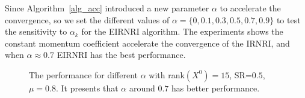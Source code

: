 \documentclass[twoside,11pt]{article}
\numberwithin{equation}{section}
\begin{document}
Since Algorithm~\ref{alg_acc} introduced a new parameter $\alpha$ to accelerate the convergence, 
so we set the different values of $\alpha =\{ 0,0.1,0.3,0.5,0.7,0.9\}$ to test the sensitivity to $\alpha_{k}$ for the EIRNRI algorithm. 
The experiments shows the constant momentum coefficient accelerate the convergence of the IRNRI,  and when $\alpha\approx 0.7$ EIRNRI has the best performance.
\begin{figure}[H]
  \captionsetup{singlelinecheck=off, justification=raggedright}
  \caption{The performance for different $\alpha$ with rank$ (X^{0})=15$, SR=$0.5$, $\mu=0.8$. It presents that $\alpha$ around $0.7$ has better performance.
  }
  \label{fig_stvAlp}
\end{figure}
\end{document}

